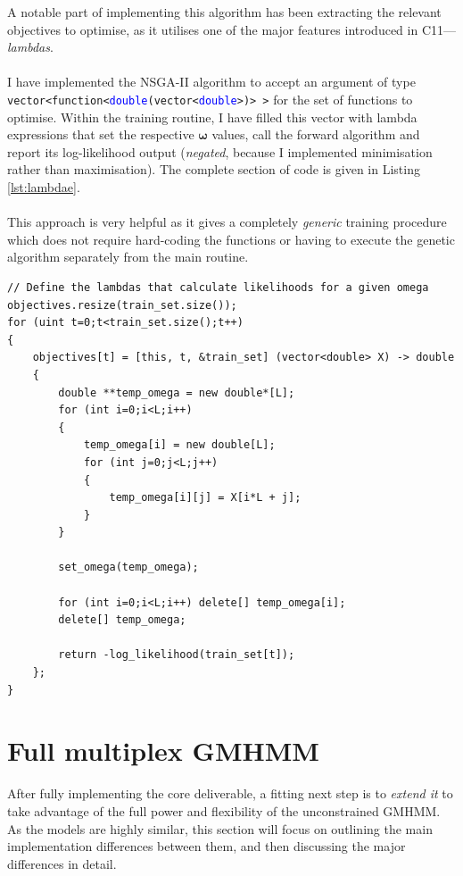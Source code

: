 \documentclass[12pt,a4paper,twoside,openright]{report}
\newcommand\bomega{\boldsymbol\omega}
\def\CC{{C\nolinebreak[4]\hspace{-.05em}\raisebox{.4ex}{\tiny\bf ++}}}
\begin{document}
\noindent A notable part of implementing this algorithm has been extracting the relevant objectives to optimise, as it utilises one of the major features introduced in \CC11---\emph{lambdas}.\\ \\
I have implemented the NSGA-II algorithm to accept an argument of type \texttt{vector<function<\textcolor{blue}{double}(vector<\textcolor{blue}{double}>)> >} for the set of functions to optimise. Within the training routine, I have filled this vector with lambda expressions that set the respective $\bomega$ values, call the forward algorithm and report its log-likelihood output (\emph{negated}, because I implemented minimisation rather than maximisation). The complete section of code is given in Listing \ref{lst:lambdae}.\\ \\
This approach is very helpful as it gives a completely \emph{generic} training procedure which does not require hard-coding the functions or having to execute the genetic algorithm separately from the main routine.
\begin{lstlisting}[caption={Code for extracting the functions to optimise, as part of the training.}, label={lst:lambdae}]
// Define the lambdas that calculate likelihoods for a given omega
objectives.resize(train_set.size());
for (uint t=0;t<train_set.size();t++)
{
	objectives[t] = [this, t, &train_set] (vector<double> X) -> double
	{
		double **temp_omega = new double*[L];
		for (int i=0;i<L;i++)
		{
			temp_omega[i] = new double[L];
			for (int j=0;j<L;j++)
			{
				temp_omega[i][j] = X[i*L + j];
			}
		}
            
		set_omega(temp_omega);
            
		for (int i=0;i<L;i++) delete[] temp_omega[i];
		delete[] temp_omega;
            
		return -log_likelihood(train_set[t]);
	};
}
\end{lstlisting}

\section{Full multiplex GMHMM}\label{secfullgmhmm}

After fully implementing the core deliverable, a fitting next step is to \emph{extend it} to take advantage of the full power and flexibility of the unconstrained GMHMM. As the models are highly similar, this section will focus on outlining the main implementation differences between them, and then discussing the major differences in detail.
\end{document}
